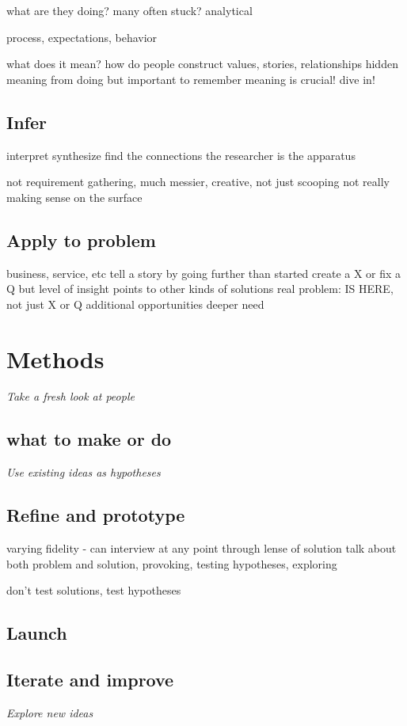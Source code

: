 \documentclass{article}
\begin{document}
what are they doing?
many often stuck?
analytical

process, expectations, behavior

what does it mean?
how do people construct values, stories, relationships
hidden
meaning from doing but important to remember meaning is crucial!
dive in!


\subsection{Infer}
interpret synthesize
find the connections
the researcher is the apparatus

not requirement gathering, much messier, creative, not just scooping
not really making sense on the surface

\subsection{Apply to problem}
business, service, etc
tell a story by going further than started
create a X or fix a Q but level of insight points to other kinds of solutions
real problem: IS HERE, not just X or Q
additional opportunities
deeper need

\section{Methods}
{\it Take a fresh look at people}
\subsection{what to make or do}

{\it Use existing ideas as hypotheses}
\subsection{Refine and prototype}
varying fidelity - can interview at any point
through lense of solution
talk about both problem and solution, provoking, testing hypotheses, exploring

don't test solutions, test hypotheses


\subsection{Launch}

\subsection{Iterate and improve}
{\it Explore new ideas}
\end{document}
